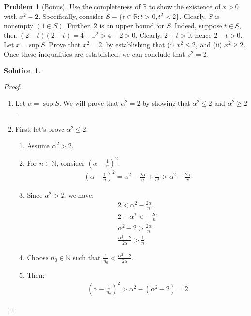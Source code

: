 \documentclass[12pt]{article}
\theoremstyle{definition} %
\newtheorem{solution}{Solution}
\newtheorem{problem}{Problem}
\theoremstyle{plain} %
\begin{document}
\begin{problem}[Bonus]
    Use the completeness of $\mathbb{R}$ to show the existence of $x>0$ with $x^2=2$. Specifically, consider $S=\{t\in \mathbb{R} : t>0, t^2<2\}$. Clearly, $S$ is nonempty $(1\in S)$. Further, $2$ is an upper bound for $S$. Indeed, suppose $t\in S$, then $(2-t)(2+t)=4-x^2>4-2>0$. Clearly, $2+t>0$, hence $2-t>0$. 
Let $x=\text{sup} \ S$. Prove that $x^2=2$, by establishing that (i) $x^2\leq 2$, and (ii) $x^2\geq 2$. Once these inequalities are established, we can conclude that $x^2=2$.

\end{problem}
\begin{solution}
    \begin{proof}
        \begin{enumerate}
            \item Let $\alpha = \sup S$. We will prove that $\alpha^2 = 2$ by showing that $\alpha^2 \leq 2$ and $\alpha^2 \geq 2$.
            \item First, let's prove $\alpha^2 \leq 2$:
            \begin{enumerate}
                \item Assume $\alpha^2 > 2$.
                \item For $n \in \mathbb{N}$, consider $(\alpha - \frac{1}{n})^2$:
                \begin{align}
                \left( \alpha-\frac{1}{n} \right)^2=\alpha^2-\frac{2\alpha}{n}+\frac{1}{n^2}>\alpha^2-\frac{2\alpha}{n}
                \end{align}
                \item Since $\alpha^2 > 2$, we have:
                \begin{align}
                2<\alpha^2-\frac{2\alpha}{n} \\
                2-\alpha^2<-\frac{2\alpha}{n} \\
                \alpha^2-2> \frac{2\alpha}{n} \\
                \frac{\alpha^2-2}{2\alpha}> \frac{1}{n}
                \end{align}
                \item Choose $n_0 \in \mathbb{N}$ such that $\frac{1}{n_0} < \frac{\alpha^2-2}{2\alpha}$.
                \item Then:
                \begin{align}
                \left( \alpha-\frac{1}{n_0} \right)^2>\alpha^2-(\alpha^2-2)=2
                \end{align}

\end{enumerate}
\end{enumerate}
\end{proof}
\end{solution}
\end{document}
